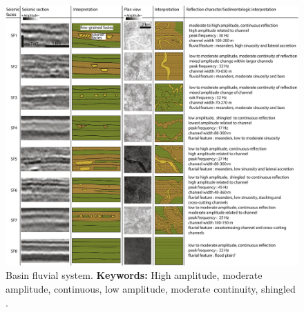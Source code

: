 \begin{figure}[h!]
    \centering
    \includegraphics[width=0.9\linewidth]{Figures/0.3Seismic/Calves2019_trace_1.png}
    \caption[Basin fluvial system.]{Basin fluvial system. \textbf{Keywords: } High amplitude, moderate amplitude, continuous, low amplitude, moderate continuity, shingled \citep{Calves2019}.}
    \label{fig:Calves2019-1}
\end{figure}

